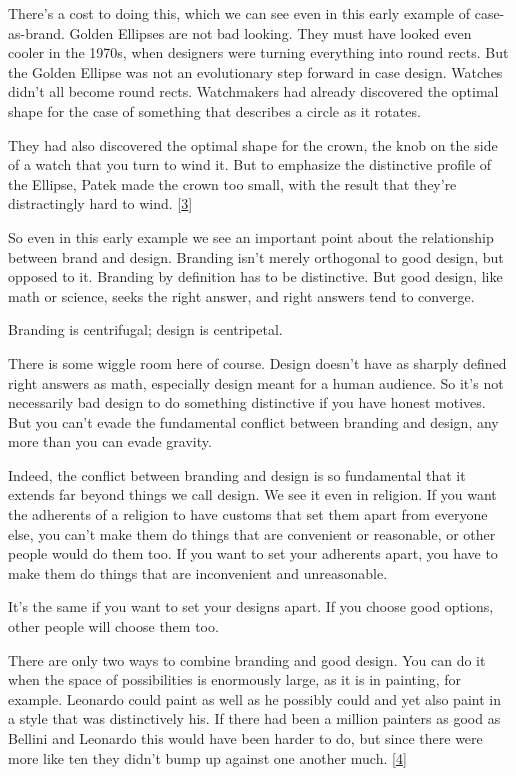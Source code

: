 There's a cost to doing this, which we can see even in this early
example of case-as-brand. Golden Ellipses are not bad looking. They must
have looked even cooler in the 1970s, when designers were turning
everything into round rects. But the Golden Ellipse was not an
evolutionary step forward in case design. Watches didn't all become
round rects. Watchmakers had already discovered the optimal shape for
the case of something that describes a circle as it rotates.

They had also discovered the optimal shape for the crown, the knob on
the side of a watch that you turn to wind it. But to emphasize the
distinctive profile of the Ellipse, Patek made the crown too small, with
the result that they're distractingly hard to wind.
{[}\hyperref[f3n]{3}{]}

So even in this early example we see an important point about the
relationship between brand and design. Branding isn't merely orthogonal
to good design, but opposed to it. Branding by definition has to be
distinctive. But good design, like math or science, seeks the right
answer, and right answers tend to converge.

Branding is centrifugal; design is centripetal.

There is some wiggle room here of course. Design doesn't have as sharply
defined right answers as math, especially design meant for a human
audience. So it's not necessarily bad design to do something distinctive
if you have honest motives. But you can't evade the fundamental conflict
between branding and design, any more than you can evade gravity.

Indeed, the conflict between branding and design is so fundamental that
it extends far beyond things we call design. We see it even in religion.
If you want the adherents of a religion to have customs that set them
apart from everyone else, you can't make them do things that are
convenient or reasonable, or other people would do them too. If you want
to set your adherents apart, you have to make them do things that are
inconvenient and unreasonable.

It's the same if you want to set your designs apart. If you choose good
options, other people will choose them too.

There are only two ways to combine branding and good design. You can do
it when the space of possibilities is enormously large, as it is in
painting, for example. Leonardo could paint as well as he possibly could
and yet also paint in a style that was distinctively his. If there had
been a million painters as good as Bellini and Leonardo this would have
been harder to do, but since there were more like ten they didn't bump
up against one another much. {[}\hyperref[f4n]{4}{]}


